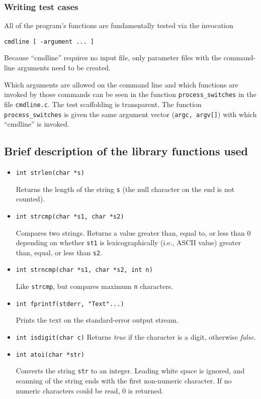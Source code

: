 \subsubsection*{Writing test cases}

All of the program's functions are fundamentally tested via 
the invocation 
\begin{verbatim}
cmdline [ -argument ... ]
\end{verbatim}
Because ``cmdline'' requires no input file, only parameter files
with the command-line arguments need to be created.

Which arguments are allowed on the command line and which functions
are invoked by those commands can be seen in the function 
{\tt process\_switches} in the file {\tt cmdline.c}.
The test scaffolding is transparent.
The function {\tt process\_switches} is given the same argument vector
({\tt argc, argv[]}) with which ``cmdline'' is invoked.

\subsection*{Brief description of the library functions used}

\begin{itemize}

\item {\tt int strlen(char *s)}

Returns the length of the string {\tt s} (the null character on the end
is not counted).

\item {\tt int strcmp(char *s1, char *s2)}

Compares two strings.  Returns a value greater than, equal to, or less
than 0 depending on whether {\tt st1} is lexicographically (i.e.,
ASCII value) greater than, equal, or less than {\tt s2}.

\item {\tt int strncmp(char *s1, char *s2, int n)}

Like {\tt strcmp}, but compares maximum {\tt n} characters.

\item {\tt int fprintf(stderr, "Text"...)}

Prints the text on the standard-error output stream.

\item {\tt int isdigit(char c)}
Returns {\em true} if the character is a digit, otherwise {\em false}.

\item {\tt int atoi(char *str)}

Converts the string {\tt str} to an integer.
Leading white space is ignored, and scanning of the string ends
with the first non-numeric character.
If no numeric characters could be read, 0 is returned.

\end{itemize}
